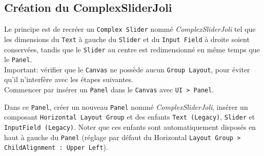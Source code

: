 \documentclass[a4paper,10pt]{article}
\newenvironment{solution}%
{\begin{tcolorbox}[breakable,colback=red!5!white,colframe=red!75!black,title=Solution]}%
{\end{tcolorbox}}
\begin{document}
\ifversionenseignant
\begin{solution}
	\subsection{Création du ComplexSliderJoli}
Le principe est de recréer un \texttt{Complex Slider} nommé \textit{ComplexSliderJoli} tel que les dimensions du \texttt{Text} à gauche du \texttt{Slider} et du \texttt{Input Field} à droite soient conservées, tandis que le \texttt{Slider} au centre est redimensionné en même temps que le \texttt{Panel}.\\

Important: vérifier que le \texttt{Canvas} ne possède aucun \texttt{Group Layout}, pour éviter qu'il n'interfère avec les étapes suivantes.\\

Commencer par insérer un \texttt{Panel} dans le \texttt{Canvas} avec \texttt{UI > Panel}.

Dans ce \texttt{Panel}, créer un nouveau \texttt{Panel} nommé \textit{ComplexSliderJoli}, insérer
un composant \texttt{Horizontal Layout Group} et
des enfants \texttt{Text (Legacy)}, \texttt{Slider} et \texttt{InputField (Legacy)}.
Noter que ces enfants sont automatiquement disposés en haut à gauche du \texttt{Panel} (réglage par défaut du Horizontal \texttt{Layout Group > ChildAlignment : Upper Left}).


\end{solution}
\end{document}
